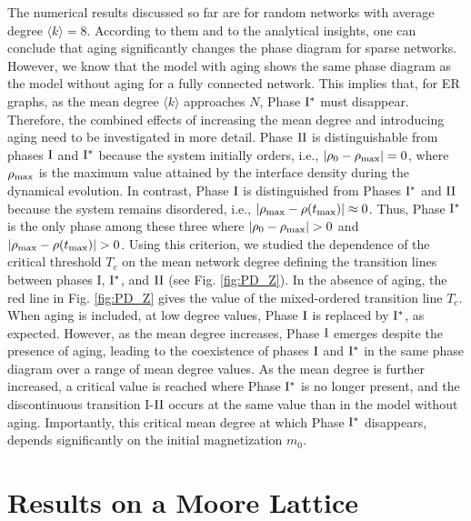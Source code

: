 The numerical results discussed so far are for random networks with average degree $\langle k \rangle = 8$. According to them and to the analytical insights, one can conclude that aging significantly changes the phase diagram for sparse networks. However, we know that the model with aging shows the same phase diagram as the model without aging for a fully connected network. This implies that, for ER graphs, as the mean degree $\langle k \rangle$ approaches $N$, Phase ${\rm I}^{*}$ must disappear. Therefore, the combined effects of increasing the mean degree and introducing aging need to be investigated in more detail. Phase ${\rm II}$ is distinguishable from phases ${\rm I}$ and ${\rm I}^{*}$ because the system initially orders, i.e., $|\rho_0 - \rho_{\rm max}| = 0$, where $\rho_{\rm max}$ is the maximum value attained by the interface density during the dynamical evolution. In contrast, Phase ${\rm I}$ is distinguished from Phases ${\rm I}^{*}$ and ${\rm II}$ because the system remains disordered, i.e., $|\rho_{\rm max} - \rho(t_{\rm max})| \approx 0$. Thus, Phase ${\rm I}^{*}$ is the only phase among these three where $|\rho_0 - \rho_{\rm max}| > 0$ and $|\rho_{\rm max} - \rho(t_{\rm max})| > 0$. Using this criterion, we studied the dependence of the critical threshold  $T_c$ on the mean network degree defining the transition lines between phases I, ${\rm I}^{*}$, and ${\rm II}$ (see Fig. \ref{fig:PD_Z}). In the absence of aging, the red line in Fig. \ref{fig:PD_Z} gives the value of the mixed-ordered transition line $T_c$. When aging is included, at low degree values, Phase ${\rm I}$ is replaced by ${\rm I}^{*}$, as expected. However, as the mean degree increases, Phase ${\rm I}$ emerges despite the presence of aging, leading to the coexistence of phases ${\rm I}$ and ${\rm I}^{*}$ in the same phase diagram over a range of mean degree values. As the mean degree is further increased, a critical value is reached where Phase ${\rm I}^{*}$ is no longer present, and the discontinuous transition I-${\rm II}$ occurs at the same value than in the model without aging. Importantly, this critical mean degree at which Phase ${\rm I}^{*}$ disappears, depends significantly on the initial magnetization $m_0$.

\section{\label{sec: Results on a Moore Lattice}  Results on a Moore Lattice}

